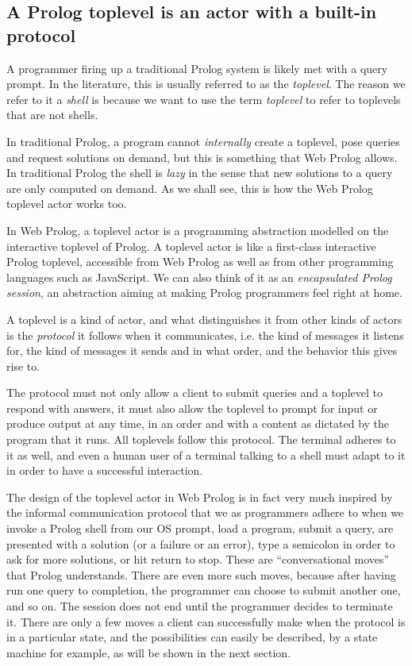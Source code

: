 \subsection{A Prolog toplevel is an actor with a built-in protocol}

A programmer firing up a traditional Prolog system is likely met with a query prompt. In the literature, this is usually referred to as the \textit{toplevel}. The reason we refer to it a \textit{shell} is because we want to use the term \textit{toplevel} to refer to toplevels that are not shells. 

In traditional Prolog, a program cannot \emph{internally} create a toplevel, pose queries and request solutions on demand, but this is something that Web Prolog allows. In traditional Prolog the shell is \textit{lazy} in the sense that new solutions to a query are only computed on demand. As we shall see, this is how the Web Prolog toplevel actor works too.

In Web Prolog, a toplevel actor is a programming abstraction modelled on the interactive toplevel of Prolog. A toplevel actor is like a first-class interactive Prolog toplevel, accessible from Web Prolog as well as from other programming languages such as JavaScript. We can also think of it as an \textit{encapsulated Prolog session}, an abstraction aiming at making Prolog programmers feel right at home.

A toplevel is a kind of actor, and what distinguishes it from other kinds of actors is the \textit{protocol} it follows when it communicates, i.e. the kind of messages it listens for, the kind of messages it sends and in what order, and the behavior this gives rise to. 

The protocol must not only allow a client to submit queries and a toplevel to respond with answers, it must also allow the toplevel to  prompt for input or produce output at any time, in an order and with a content as dictated by the program that it runs. All toplevels follow this protocol. The terminal adheres to it as well, and even a human user of a terminal talking to a shell must adapt to it in order to have a successful interaction.

The design of the toplevel actor in Web Prolog is in fact very much inspired by the informal communication protocol that we as programmers adhere to when we invoke a Prolog shell from our OS prompt, load a program, submit a query, are presented with a solution (or a failure or an error), type a semicolon in order to ask for more solutions, or hit return to stop. These are ``conversational moves'' that Prolog understands. There are even more such moves, because after having run one query to completion, the programmer can choose to submit another one, and so on. The session does not end until the programmer decides to terminate it. There are only a few moves a client can successfully make when the protocol is in a particular state, and the possibilities can easily be described, by a state machine for example, as will be shown in the next section.

